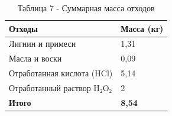 \begin{table}[H]
\caption*{Таблица 7 - Суммарная масса отходов}
\centering
\begin{tabular}{|l|l|}
\hline
Отходы                     & Масса (кг)    \\ \hline
Лигнин и примеси           & 1,31          \\ \hline
Масла и воски              & 0,09          \\ \hline
Отработанная кислота (HCl) & 5,14          \\ \hline
Отработанный раствор H₂O₂  & 2             \\ \hline
\textbf{Итого}             & \textbf{8,54} \\ \hline
\end{tabular}
\end{table}

